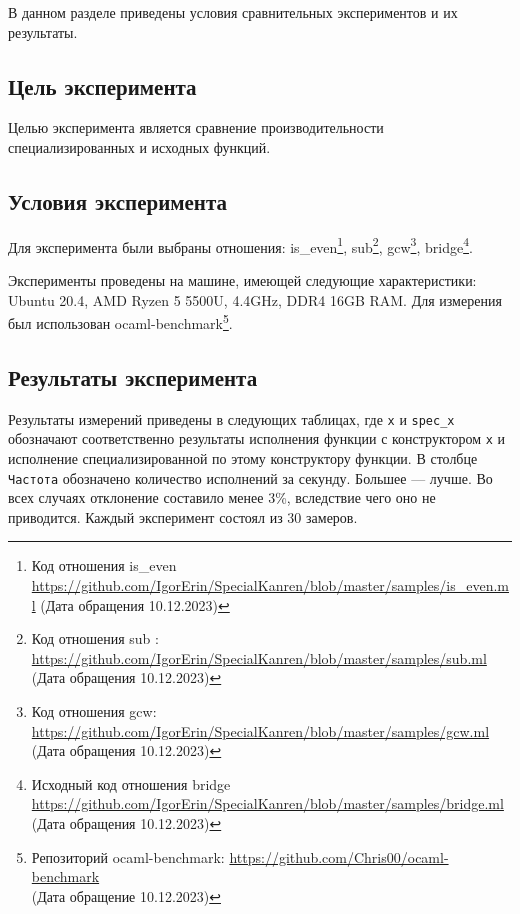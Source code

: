 
\newcommand{\NA}{---}

В данном разделе приведены условия сравнительных экспериментов и их результаты.

\subsection{Цель эксперимента}

Целью эксперимента является сравнение производительности специализированных и исходных функций. 

\subsection{Условия эксперимента}

Для эксперимента были выбраны отношения: 
is\_even\footnote{Код отношения is\_even 
\url{https://github.com/IgorErin/SpecialKanren/blob/master/samples/is_even.ml} (Дата обращения 10.12.2023)}, sub\footnote{Код отношения sub : \url{https://github.com/IgorErin/SpecialKanren/blob/master/samples/sub.ml} (Дата обращения 10.12.2023)}, gcw\footnote{Код отношения gcw: \url{https://github.com/IgorErin/SpecialKanren/blob/master/samples/gcw.ml} (Дата обращения 10.12.2023)}, bridge\footnote{Исходный код отношения bridge \url{https://github.com/IgorErin/SpecialKanren/blob/master/samples/bridge.ml} (Дата обращения 10.12.2023)}.

Эксперименты проведены на машине, имеющей следующие характеристики: Ubuntu 20.4, AMD Ryzen 5 5500U, 4.4GHz, DDR4 16GB RAM. Для измерения был использован ocaml-benchmark\footnote{Репозиторий ocaml-benchmark: \url{https://github.com/Chris00/ocaml-benchmark} \\ (Дата обращение 10.12.2023)}.

\subsection{Результаты эксперимента}

Результаты измерений приведены в следующих таблицах, где \verb|x| и \verb|spec_x| обозначают соответственно результаты исполнения функции с конструктором \verb|x| и исполнение специализированной по этому конструктору функции. В столбце \verb|Частота| обозначено количество исполнений за секунду. Большее --- лучше. Во всех случаях отклонение составило менее 3\%, вследствие чего оно не приводится. Каждый эксперимент состоял из 30 замеров.

